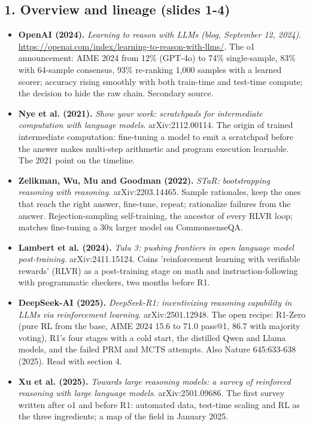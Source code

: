 \documentclass[11pt,letterpaper]{article}
\begin{document}
\subsection*{1. Overview and lineage (slides 1-4)}
\begin{itemize}[leftmargin=1.2em,itemsep=3pt]\sloppy
\item \textbf{OpenAI (2024).} \textit{Learning to reason with LLMs (blog, September 12, 2024)}. \url{https://openai.com/index/learning-to-reason-with-llms/}. The o1 announcement: AIME 2024 from 12\% (GPT-4o) to 74\% single-sample, 83\% with 64-sample consensus, 93\% re-ranking 1,000 samples with a learned scorer; accuracy rising smoothly with both train-time and test-time compute; the decision to hide the raw chain. Secondary source.
\item \textbf{Nye et al. (2021).} \textit{Show your work: scratchpads for intermediate computation with language models}. arXiv:2112.00114. The origin of trained intermediate computation: fine-tuning a model to emit a scratchpad before the answer makes multi-step arithmetic and program execution learnable. The 2021 point on the timeline.
\item \textbf{Zelikman, Wu, Mu and Goodman (2022).} \textit{STaR: bootstrapping reasoning with reasoning}. arXiv:2203.14465. Sample rationales, keep the ones that reach the right answer, fine-tune, repeat; rationalize failures from the answer. Rejection-sampling self-training, the ancestor of every RLVR loop; matches fine-tuning a 30x larger model on CommonsenseQA.
\item \textbf{Lambert et al. (2024).} \textit{Tulu 3: pushing frontiers in open language model post-training}. arXiv:2411.15124. Coins 'reinforcement learning with verifiable rewards' (RLVR) as a post-training stage on math and instruction-following with programmatic checkers, two months before R1.
\item \textbf{DeepSeek-AI (2025).} \textit{DeepSeek-R1: incentivizing reasoning capability in LLMs via reinforcement learning}. arXiv:2501.12948. The open recipe: R1-Zero (pure RL from the base, AIME 2024 15.6 to 71.0 pass@1, 86.7 with majority voting), R1's four stages with a cold start, the distilled Qwen and Llama models, and the failed PRM and MCTS attempts. Also Nature 645:633-638 (2025). Read with section 4.
\item \textbf{Xu et al. (2025).} \textit{Towards large reasoning models: a survey of reinforced reasoning with large language models}. arXiv:2501.09686. The first survey written after o1 and before R1: automated data, test-time scaling and RL as the three ingredients; a map of the field in January 2025.

\end{itemize}
\end{document}
